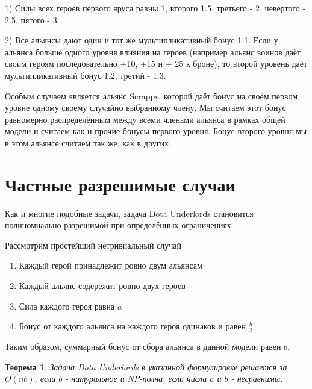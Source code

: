 \documentclass{article}
\newtheorem{theorem}{Теорема}
\begin{document}
1) Силы всех героев первого яруса равны 1, второго 1.5, третьего - 2, чевертого - 2.5, пятого - 3

2) Все альянсы дают один и тот же мультипликативный бонус 1.1. Если у альянса больше одного уровня влияния на героев (например альянс воинов даёт своим героям последовательно +10, +15 и + 25 к броне), то второй уровень даёт мультипликативный бонус 1.2, третий - 1.3.

Особым случаем является альянс Scrappy, которой даёт бонус на своём первом уровне одному своему случайно выбранному члену. Мы считаем этот бонус равномерно распределённым между всеми членами альянса в рамках общей модели и считаем как и прочие бонусы первого уровня. Бонус второго уровня мы в этом альянсе считаем так же, как в других.

\section{Частные разрешимые случаи}

Как и многие подобные задачи, задача Dota Underlords становится полиномиально разрешимой при определённых ограничениях. 

Рассмотрим простейший нетривиальный случай

\begin{enumerate}
    \item Каждый герой принадлежит ровно двум альянсам
    \item Каждый альянс содережит ровно двух героев
    \item Сила каждого героя равна $a$
    \item Бонус от каждого альянса на каждого героя одинаков и равен $\frac{b}{2}$
\end{enumerate}

Таким образом, суммарный бонус от сбора альянса в данной модели равен $b$. 

\begin{theorem}
    Задача Dota Underlords в указанной формулировке решается за $O(nb)$, если $b$ - натуральное и NP-полна, если числа $a$ и $b$ - несравнимы. 
\end{theorem}
\end{document}
